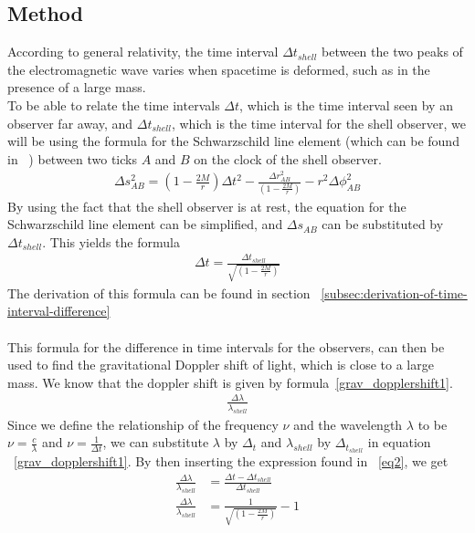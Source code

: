\documentclass[reprint,english,notitlepage]{revtex4-2}
\begin{document}
    \subsection{Method}\label{subsec:method1}
        According to general relativity, the time interval $\Delta t_{shell}$ between the two peaks of the electromagnetic wave varies when spacetime is deformed, such as in the presence of a large mass.\\
        To be able to relate the time intervals $\Delta t$, which is the time interval seen by an observer far away, and $\Delta t_{shell}$, which is the time interval for the shell observer, we will be using the formula for the Schwarzschild line element (which can be found in ~\parencite[][]{lecture2c}) between two ticks $A$ and $B$ on the clock of the shell observer.
        \begin{align}
            \Delta s^2_{AB} = \left(1-\frac{2M}{r}\right) \Delta t^2 - \frac{\Delta r^2_{AB}}{\left(1-\frac{2M}{r}\right)} - r^2 \Delta \phi^2_{AB} \label{schwarzschild_line}
        \end{align}
        By using the fact that the shell observer is at rest, the equation for the Schwarzschild line element can be simplified, and $\Delta s_{AB}$ can be substituted by $\Delta t_{shell}$.
        This yields the formula
        \begin{align}
                \Delta t = \frac{\Delta t_{shell}}{\sqrt{\left(1-\frac{2M}{r}\right)}} \label{eq2}
        \end{align}
        The derivation of this formula can be found in section ~\ref{subsec:derivation-of-time-interval-difference}\\\\

        This formula for the difference in time intervals for the observers, can then be used to find the gravitational Doppler shift of light, which is close to a large mass.
        We know that the doppler shift is given by formula~\eqref{grav_dopplershift1}.
        \begin{align}
            \frac{\Delta \lambda}{\lambda_{shell}} \label{grav_dopplershift1}
        \end{align}
        Since we define the relationship of the frequency $\nu$ and the wavelength $\lambda$ to be $\nu = \frac{c}{\lambda}$ and $\nu = \frac{1}{\Delta t}$, we can substitute $\lambda$ by $\Delta_t$ and $\lambda_{shell}$ by $\Delta_t_{shell}$ in equation ~\eqref{grav_dopplershift1}.
        By then inserting the expression found in ~\eqref{eq2}, we get
        \begin{align}
            \frac{\Delta \lambda}{\lambda_{shell}} &= \frac{\Delta t - \Delta t_{shell}}{\Delta t_{shell}}\\
            \frac{\Delta \lambda}{\lambda_{shell}} &= \frac{1}{\sqrt{\left(1-\frac{2M}{r}\right)}} - 1
        \end{align}\\\\
\end{document}
